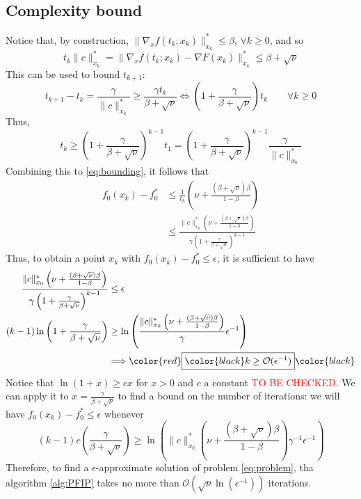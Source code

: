 \documentclass[12pt, openany]{report}
\theoremstyle{definition}
\begin{document}
\subsection{Complexity bound}
Notice that, by construction, $\|\nabla_xf(t_k;x_k)\|_{x_k}^*\le \beta$, $\forall k\ge 0$, and so 
\begin{equation}
	t_k \|c\|_{x_k}^* = \|\nabla_x f(t_k;x_k)-\nabla F(x_k)\|_{x_k}^* \le \beta +\sqrt{\nu}
\end{equation}
This can be used to bound $t_{k+1}$: 
\begin{equation}
	t_{k+1}-t_k = \frac{\gamma}{\|c\|_{x_k}^*}\ge \frac{\gamma t_k}{\beta+\sqrt{\nu}} \Longleftrightarrow \left(1+\frac{\gamma}{\beta+\sqrt{\nu}}\right)t_k \qquad \forall k\ge 0
\end{equation}
Thus,
\begin{equation}\label{eq:t_k}
	t_k \ge \left(1+\frac{\gamma}{\beta+\sqrt{\nu}}\right)^{k-1}t_1 = \left(1+\frac{\gamma}{\beta+\sqrt{\nu}}\right)^{k-1} \frac{\gamma}{\|c\|_{x_0}^*}
\end{equation}
Combining this to \eqref{eq:bounding}, it follows that 
\begin{equation}
	\begin{aligned}
		f_0(x_k)-f_0^* &\le \frac{1}{t_k}\left(\nu+\frac{(\beta+\sqrt{\nu})\beta}{1-\beta}\right)\\
		& \le \frac{\|c\|_{x_0}^* \left(\nu +\frac{(\beta+\sqrt{\nu})\beta}{1-\beta}\right)}{\gamma \left(1+\frac{\gamma}{\beta+\sqrt{\nu}}\right)^{k-1}}
	\end{aligned}
\end{equation}
Thus, to obtain a point $x_k$ with $f_0(x_k)-f_0^* \le \epsilon$, it is sufficient to have 
\begin{equation}
	\begin{aligned}
		\frac{\|c\|_{x_0}^*\left(\nu + \frac{(\beta+\sqrt{\nu})\beta}{1-\beta}\right)}{\gamma\left(1+\frac{\gamma}{\beta+\sqrt{\nu}}\right)^{k-1}}&\le \epsilon \\
		(k-1) \ln\left(1+\frac{\gamma}{\beta+\sqrt{\nu}}\right) &\ge \ln \left(\frac{\|c\|_{x_0}^* \left(\nu +\frac{(\beta+\sqrt{\nu})\beta}{1-\beta}\right)}{\gamma}\epsilon^{-1}\right)\\
		&\Longrightarrow \color{red}\boxed{\color{black}k \ge \mathcal{O}(\epsilon^{-1})}\color{black}
	\end{aligned}
\end{equation}
Notice that $\ln(1+x)\ge cx$ for $x>0$ and $c$ a constant \textcolor{red}{TO BE CHECKED}. We can apply it to $x=\frac{\gamma}{\beta+\sqrt{\nu}}$ to find a bound on the number of iterations: we will have $f_0(x_k)-f_0^* \le \epsilon$ whenever
\begin{equation}
	(k-1)c\left(\frac{\gamma}{\beta+\sqrt{\nu}}\right)\ge \ln \left(\|c\|_{x_0}^* \left(\nu + \frac{(\beta+\sqrt{\nu})\beta}{1-\beta}\right)\gamma^{-1} \epsilon^{-1}\right)
\end{equation}
Therefore, to find a $\epsilon$-approximate solution of problem \eqref{eq:problem}, tha algorithm \ref{alg:PFIP} takes no more than $\mathcal{O}(\sqrt{\nu}\ln(\epsilon^{-1}))$ iterations.
\end{document}
